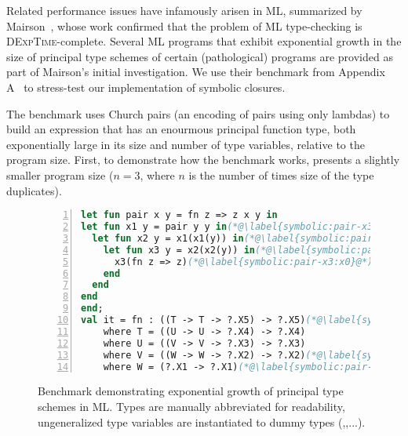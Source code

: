 
Related performance issues have infamously arisen in ML, summarized
by Mairson~\cite{Mairson:1989}, whose work confirmed
that the problem of ML type-checking is \textsc{DExpTime}-complete.
Several ML programs that exhibit exponential
growth in the size of principal type schemes of certain (pathological)
programs are provided as part of Mairson's initial investigation.
We use their benchmark from Appendix A~\cite{Mairson:1989} to stress-test our implementation of symbolic closures.

The benchmark uses Church pairs (an encoding of pairs using only lambdas)
to build an expression that has an enourmous principal function type,
both exponentially large in its size and number of type variables, relative
to the program size.
First, to demonstrate how the benchmark works, 
presents a slightly smaller program size
($n=3$, where $n$ is the number of times size of the type duplicates).


\begin{figure}
\begin{lstlisting}[language=ml, numbers=left]
let fun pair x y = fn z => z x y in
let fun x1 y = pair y y in(*@\label{symbolic:pair-x3:x1}@*)
  let fun x2 y = x1(x1(y)) in(*@\label{symbolic:pair-x3:x2}@*)
    let fun x3 y = x2(x2(y)) in(*@\label{symbolic:pair-x3:x3}@*)
      x3(fn z => z)(*@\label{symbolic:pair-x3:x0}@*)
    end
  end
end
end;
val it = fn : ((T -> T -> ?.X5) -> ?.X5)(*@\label{symbolic:pair-x3:it}@*)
    where T = ((U -> U -> ?.X4) -> ?.X4)
    where U = ((V -> V -> ?.X3) -> ?.X3)
    where V = ((W -> W -> ?.X2) -> ?.X2)(*@\label{symbolic:pair-x3:X2}@*)
    where W = (?.X1 -> ?.X1)(*@\label{symbolic:pair-x3:W}@*)
\end{lstlisting}
\caption{Benchmark demonstrating exponential growth of principal type schemes in ML.
  Types are manually abbreviated for readability, ungeneralized type variables are
  instantiated to dummy types (,,...).}
\label{symbolic:figure:pair-benchmark}
\end{figure}

